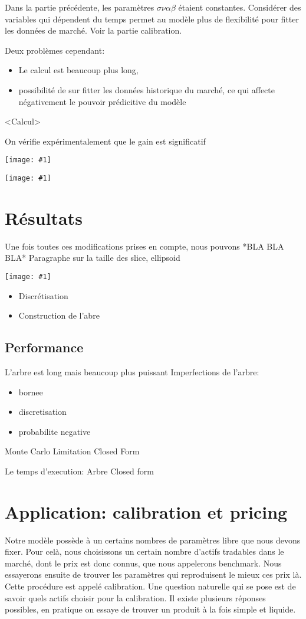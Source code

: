\documentclass[paper=a4, fontsize=11pt]{scrartcl}
\numberwithin{equation}{section}		%
\numberwithin{figure}{section}			%
\numberwithin{table}{section}				%
\theoremstyle{definition}
\newcommand{\IMG}[3]{
  \begin{center}
    \texttt{[image: \#1]}%
    \end{center}
}
\begin{document}
Dans la partie précédente, les paramètres $\sigma \nu \alpha \beta$ étaient constantes. Considérer des variables qui dépendent  du temps permet au modèle plus de flexibilité pour fitter les données de marché. Voir la partie calibration.

Deux problèmes cependant:

\begin{itemize}
\item Le calcul est beaucoup plus long,
\item possibilité de sur fitter les données historique du marché, ce qui affecte négativement le pouvoir prédicitive du modèle
\end{itemize}

<Calcul>

On vérifie expérimentalement que le gain est significatif

\IMG{img/pending.jpg}{Cache grind avant}{0.2}
\IMG{img/pending.jpg}{Cache grind apres}{0.2}

\section{Résultats}

Une fois toutes ces modifications prises en compte, nous pouvons *BLA BLA BLA*
Paragraphe sur la taille des slice, ellipsoid
\IMG{img/pending.jpg}{Slice 2D}{0.2}


\begin{itemize}
\item Discrétisation
\item Construction de l'abre
\end{itemize}


\subsection{Performance}
L'arbre est long mais beaucoup plus puissant
Imperfections de l'arbre:
\begin{itemize}
\item  bornee
\item  discretisation
\item  probabilite negative
\end{itemize}
Monte Carlo
Limitation
Closed Form

Le temps d'execution:
Arbre
Closed form

\newpage

\section{Application: calibration et pricing}
Notre modèle possède à un certains nombres de paramètres libre que nous devons fixer. Pour celà, nous choisissons un certain nombre d'actifs tradables dans le marché, dont le prix est donc connus, que nous appelerons benchmark. Nous essayerons ensuite de trouver les paramètres qui reproduisent le mieux ces prix là. Cette procédure est appelé calibration.
Une question naturelle qui se pose est de savoir quels actifs choisir pour la calibration. Il existe plusieurs réponses possibles, en pratique on essaye de trouver un produit à la fois simple et liquide.
\end{document}
